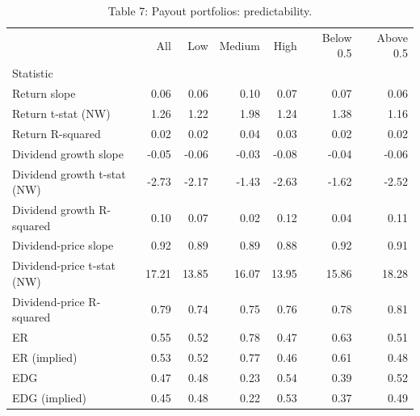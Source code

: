 \begin{table}
\caption{Table 7: Payout portfolios: predictability.}
\label{tab:replication_7}
\begin{tabular}{lrrrrrr}
\toprule
 & All & Low & Medium & High & Below 0.5 & Above 0.5 \\
Statistic &  &  &  &  &  &  \\
\midrule
Return slope & 0.06 & 0.06 & 0.10 & 0.07 & 0.07 & 0.06 \\
Return t-stat (NW) & 1.26 & 1.22 & 1.98 & 1.24 & 1.38 & 1.16 \\
Return R-squared & 0.02 & 0.02 & 0.04 & 0.03 & 0.02 & 0.02 \\
Dividend growth slope & -0.05 & -0.06 & -0.03 & -0.08 & -0.04 & -0.06 \\
Dividend growth t-stat (NW) & -2.73 & -2.17 & -1.43 & -2.63 & -1.62 & -2.52 \\
Dividend growth R-squared & 0.10 & 0.07 & 0.02 & 0.12 & 0.04 & 0.11 \\
Dividend-price slope & 0.92 & 0.89 & 0.89 & 0.88 & 0.92 & 0.91 \\
Dividend-price t-stat (NW) & 17.21 & 13.85 & 16.07 & 13.95 & 15.86 & 18.28 \\
Dividend-price R-squared & 0.79 & 0.74 & 0.75 & 0.76 & 0.78 & 0.81 \\
ER & 0.55 & 0.52 & 0.78 & 0.47 & 0.63 & 0.51 \\
ER (implied) & 0.53 & 0.52 & 0.77 & 0.46 & 0.61 & 0.48 \\
EDG & 0.47 & 0.48 & 0.23 & 0.54 & 0.39 & 0.52 \\
EDG (implied) & 0.45 & 0.48 & 0.22 & 0.53 & 0.37 & 0.49 \\
\bottomrule
\end{tabular}
\end{table}
